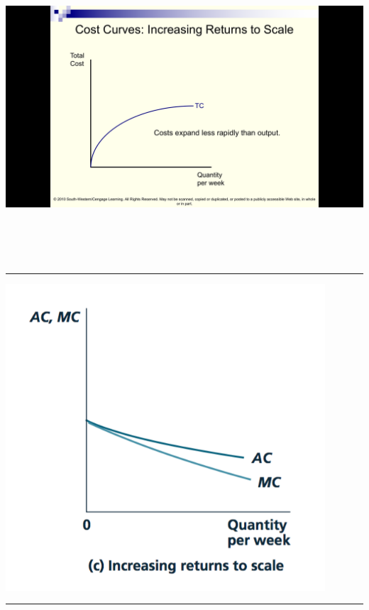 \documentclass[]{article}
\begin{document}
\includegraphics[height=4.5in]{picsfigs/irsTCcurve.png}

\begin{center}\rule{0.5\linewidth}{\linethickness}\end{center}

\includegraphics[height=4.5in]{picsfigs/irscosts_fix.png}

\begin{center}\rule{0.5\linewidth}{\linethickness}\end{center}
\end{document}
